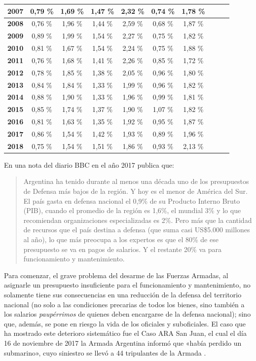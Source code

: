 \documentclass[12pt,a4paper,twoside]{book}
\begin{document}
\begin{center}
\begin{longtable}{|c|c|c|c|c|c|c|c|c|c|}
\hline
\textbf{2007} & 0,79 \% & 1,69 \% & 1,47 \% & 2,32 \% & 0,74 \% & 1,78 \% \\
\hline
\textbf{2008} & 0,76 \% & 1,96 \% & 1,44 \% & 2,59 \% & 0,68 \% & 1,87 \% \\
\hline
\textbf{2009} & 0,89 \% & 1,99 \% & 1,54 \% & 2,27 \% & 0,75 \% & 1,82 \% \\
\hline
\textbf{2010} & 0,81 \% & 1,67 \% & 1,54 \% & 2,24 \% & 0,75 \% & 1,88 \% \\
\hline
\textbf{2011} & 0,76 \% & 1,68 \% & 1,41 \% & 2,26 \% & 0,85 \% & 1,72 \% \\
\hline
\textbf{2012} & 0,78 \% & 1,85 \% & 1,38 \% & 2,05 \% & 0,96 \% & 1,80 \% \\
\hline
\textbf{2013} & 0,84 \% & 1,84 \% & 1,33 \% & 1,99 \% & 0,96 \% & 1,82 \% \\
\hline
\textbf{2014} & 0,88 \% & 1,90 \% & 1,33 \% & 1,96 \% & 0,99 \% & 1,81 \% \\
\hline
\textbf{2015} & 0,85 \% & 1,74 \% & 1,37 \% & 1,90 \% & 1,07 \% & 1,82 \% \\
\hline
\textbf{2016} & 0,81 \% & 1,63 \% & 1,35 \% & 1,92 \% & 0,95 \% & 1,87 \% \\
\hline
\textbf{2017} & 0,86 \% & 1,54 \% & 1,42 \% & 1,93 \% & 0,89 \% & 1,96 \% \\
\hline
\textbf{2018} & 0,75 \% & 1,54 \% & 1,51 \% & 1,86 \% & 0,93 \% & 2,13 \% \\
\hline
\end{longtable}
\end{center}

En una nota del diario BBC en el año 2017 publica que:

\begin{quotation}
Argentina ha tenido durante al menos una década uno de los presupuestos de Defensa más bajos de la región. Y hoy es el menor de América del Sur. El país gasta en defensa nacional el 0,9\% de su Producto Interno Bruto (PIB), cuando el promedio de la región es 1,6\%, el mundial 3\% y lo que recomiendan organizaciones especializadas es 2\%. Pero más que la cantidad de recursos que el país destina a defensa (que suma casi US\$5.000 millones al año), lo que más preocupa a los expertos es que el 80\% de ese presupuesto se va en pagos de salarios. Y el restante 20\% va para funcionamiento y mantenimiento. \cite{defensanac:bbc}
\end{quotation}

Para comenzar, el grave problema del desarme de las Fuerzas Armadas, al asignarle un presupuesto insuficiente para el funcionamiento y mantenimiento, no solamente tiene sus consecuencias en una reducción de la defensa del territorio nacional (no solo a las condiciones precarias de todos los bienes, sino también a los salarios \textit{paupérrimos} de quienes deben encargarse de la defensa nacional); sino que, además, se pone en riesgo la vida de los oficiales y suboficiales. El caso que ha mostrado este deterioro sistemático fue el Caso ARA San Juan, el cual el día 16 de noviembre de 2017 la Armada Argentina informó que «había perdido un submarino», cuyo siniestro se llevó a 44 tripulantes de la Armada \cite{caso:ara-san-juan}.
\end{document}
